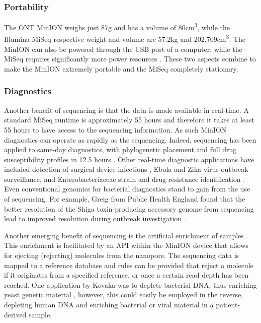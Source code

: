\subsubsection{Portability}
The ONT MinION weighs just 87g and has a volume of 80cm\textsuperscript{3}, while the Illumina MiSeq respective weight and volume are 57.2kg and 202,709cm\textsuperscript{3}. The MinION can also be powered through the USB port of a computer, while the MiSeq requires significantly more power resources \cite{Tedersoo2021}. These two aspects combine to make the MinION extremely portable and the MiSeq completely stationary.

\subsubsection{Diagnostics}
Another benefit of \ont{} sequencing is that the data is made available in real-time. A standard MiSeq runtime is approximately 55 hours \cite{Tedersoo2021} and therefore it takes at least 55 hours to have access to the sequencing information. As such MinION diagnostics can operate as rapidly as the sequencing. Indeed, \ont{} sequencing has been applied to same-day \mtb{} diagnostics, with phylogenetic placement and full drug susceptibility profiles in 12.5 hours \cite{Votintseva2017}. Other real-time diagnostic applications have included detection of surgical device infections \cite{Sanderson2018}, Ebola \cite{Hoenen2016,quick2016} and Zika \cite{faria2016} virus outbreak surveillance, and Enterobacteriaceae strain and drug resistance identification \cite{Cao2016}. Even conventional genomics for bacterial diagnostics stand to gain from the use of \ont{} sequencing. For example, Greig \etal{} from Public Health England found that the better resolution of the Shiga toxin-producing \ecoli{} accessory genome from \ont{} sequencing lead to improved resolution during outbreak investigation \cite{greig2021}.

Another emerging benefit of \ont{} sequencing is the artificial enrichment of samples \cite{Payne2021,Kovaka2021}. This enrichment is facilitated by an API within the MinION device that allows for ejecting (rejecting) molecules from the nanopore. The sequencing data is mapped to a reference database and rules can be provided that reject a molecule if it originates from a specified reference, or once a certain read depth has been reached. One application by Kovaka \etal{} was to deplete bacterial DNA, thus enriching yeast genetic material \cite{Kovaka2021}, however, this could easily be employed in the reverse, depleting human DNA and enriching bacterial or viral material in a patient-derived sample.  

